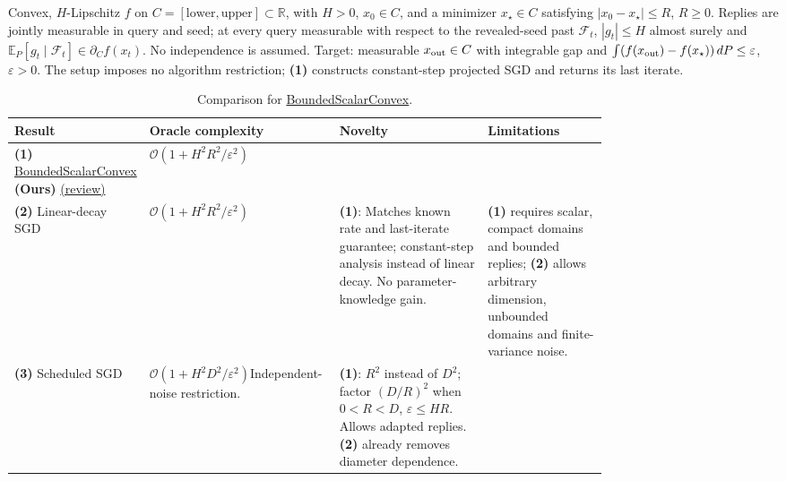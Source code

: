\begin{table}[tp]
\centering
\caption{Comparison for \href{https://github.com/k3nfalt/longtails/blob/main/LongTails/Setups/BoundedScalarConvex.lean}{BoundedScalarConvex}.}\label{tab:BoundedScalarConvex}
\parbox{\linewidth}{\footnotesize Convex, $H$-Lipschitz $f$ on $C=[\mathrm{lower},\mathrm{upper}]\subset\mathbb R$, with $H>0$, $x_0\in C$, and a minimizer $x_\star\in C$ satisfying $|x_0-x_\star|\le R$, $R\ge0$. Replies are jointly measurable in query and seed; at every query measurable with respect to the revealed-seed past $\mathcal F_t$, $|g_t|\le H$ almost surely and $\mathbb E_P[g_t\mid\mathcal F_t]\in\partial_C f(x_t)$. No independence is assumed. Target: measurable $x_{\rm out}\in C$ with integrable gap and $\int(f(x_{\rm out})-f(x_\star))\,dP\le\varepsilon$, $\varepsilon>0$. The setup imposes no algorithm restriction; \textbf{(1)} constructs constant-step projected SGD and returns its last iterate.}\par\smallskip
\begin{threeparttable}
\footnotesize
\setlength{\tabcolsep}{4pt}\renewcommand{\arraystretch}{1.25}
\begin{tabularx}{\linewidth}{@{}>{\raggedright\arraybackslash}p{0.20\linewidth}>{\raggedright\arraybackslash}p{0.32\linewidth}>{\raggedright\arraybackslash}p{0.25\linewidth}>{\raggedright\arraybackslash}X@{}}
\toprule
\textbf{Result} & \textbf{Oracle complexity} & \textbf{Novelty} & \textbf{Limitations} \\
\midrule
\textbf{(1)} \href{https://github.com/k3nfalt/longtails/blob/main/LongTails/Theorems/BoundedScalarConvex.lean}{Bounded\allowbreak Scalar\allowbreak Convex} \textbf{(Ours)} \href{https://github.com/k3nfalt/longtails/blob/main/scripts/reviews/BoundedScalarConvex.md}{(review)}
& $\mathcal{O}(1+H^2R^2/\varepsilon^2)$ & & \\
\midrule[1.2pt]
\textbf{(2)} Linear-decay SGD \citep[Thm.~3.4, v4]{bscLiuZhou2026}
& $\mathcal{O}(1+H^2R^2/\varepsilon^2)$
& \textbf{(1)}: Matches known rate and last-iterate guarantee; constant-step analysis instead of linear decay. No parameter-knowledge gain.
& \textbf{(1)} requires scalar, compact domains and bounded replies; \textbf{(2)} allows arbitrary dimension, unbounded domains and finite-variance noise. \\
\midrule
\textbf{(3)} Scheduled SGD \citep[Thm.~1, full version]{bscJainEtAl2019}
& $\mathcal{O}(1+H^2D^2/\varepsilon^2)$\newline Independent-noise restriction.
& \textbf{(1)}: $R^2$ instead of $D^2$; factor $(D/R)^2$ when $0<R<D$, $\varepsilon\le HR$. Allows adapted replies. \textbf{(2)} already removes diameter dependence.

\end{tabularx}
\end{threeparttable}
\end{table}
